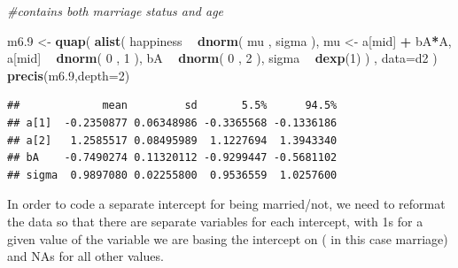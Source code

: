 \documentclass[
]{article}
\newenvironment{Shaded}{\begin{snugshade}}{\end{snugshade}}
\newcommand{\CommentTok}[1]{\textcolor[rgb]{0.56,0.35,0.01}{\textit{#1}}}
\newcommand{\DataTypeTok}[1]{\textcolor[rgb]{0.13,0.29,0.53}{#1}}
\newcommand{\DecValTok}[1]{\textcolor[rgb]{0.00,0.00,0.81}{#1}}
\newcommand{\FloatTok}[1]{\textcolor[rgb]{0.00,0.00,0.81}{#1}}
\newcommand{\KeywordTok}[1]{\textcolor[rgb]{0.13,0.29,0.53}{\textbf{#1}}}
\newcommand{\NormalTok}[1]{#1}
\newcommand{\OperatorTok}[1]{\textcolor[rgb]{0.81,0.36,0.00}{\textbf{#1}}}
\newcommand{\StringTok}[1]{\textcolor[rgb]{0.31,0.60,0.02}{#1}}
\begin{document}
\begin{Shaded}
\begin{Highlighting}[]
\CommentTok{#contains both marriage status and age}

\NormalTok{m6}\FloatTok{.9}\NormalTok{ <-}\StringTok{ }\KeywordTok{quap}\NormalTok{(}
    \KeywordTok{alist}\NormalTok{(}
\NormalTok{        happiness }\OperatorTok{~}\StringTok{ }\KeywordTok{dnorm}\NormalTok{( mu , sigma ),}
\NormalTok{        mu <-}\StringTok{ }\NormalTok{a[mid] }\OperatorTok{+}\StringTok{ }\NormalTok{bA}\OperatorTok{*}\NormalTok{A,}
\NormalTok{        a[mid] }\OperatorTok{~}\StringTok{ }\KeywordTok{dnorm}\NormalTok{( }\DecValTok{0}\NormalTok{ , }\DecValTok{1}\NormalTok{ ),}
\NormalTok{        bA }\OperatorTok{~}\StringTok{ }\KeywordTok{dnorm}\NormalTok{( }\DecValTok{0}\NormalTok{ , }\DecValTok{2}\NormalTok{ ),}
\NormalTok{        sigma }\OperatorTok{~}\StringTok{ }\KeywordTok{dexp}\NormalTok{(}\DecValTok{1}\NormalTok{)}
\NormalTok{    ) , }\DataTypeTok{data=}\NormalTok{d2 )}
\KeywordTok{precis}\NormalTok{(m6}\FloatTok{.9}\NormalTok{,}\DataTypeTok{depth=}\DecValTok{2}\NormalTok{)}
\end{Highlighting}
\end{Shaded}

\begin{verbatim}
##             mean         sd       5.5%      94.5%
## a[1]  -0.2350877 0.06348986 -0.3365568 -0.1336186
## a[2]   1.2585517 0.08495989  1.1227694  1.3943340
## bA    -0.7490274 0.11320112 -0.9299447 -0.5681102
## sigma  0.9897080 0.02255800  0.9536559  1.0257600
\end{verbatim}

In order to code a separate intercept for being married/not, we need to
reformat the data so that there are separate variables for each
intercept, with 1s for a given value of the variable we are basing the
intercept on ( in this case marriage) and NAs for all other values.
\end{document}
